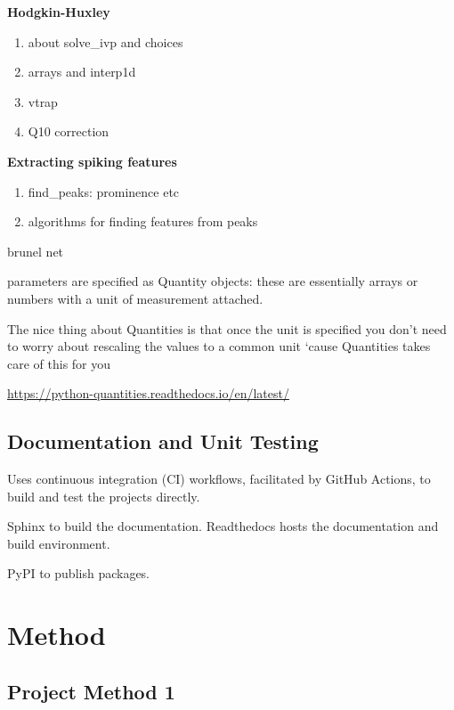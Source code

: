 \textbf{Hodgkin-Huxley}

\begin{enumerate}
    \item about solve\_ivp and choices 
    \item arrays and interp1d
    \item vtrap 
    \item Q10 correction
\end{enumerate}

\textbf{Extracting spiking features}

\begin{enumerate}
    \item find\_peaks: prominence etc 
    \item algorithms for finding features from peaks 
\end{enumerate} 

brunel net

parameters are specified as Quantity objects: these are essentially arrays or numbers with a unit of measurement attached.

The nice thing about Quantities is that once the unit is specified you don’t need to worry about rescaling the values to a common unit ‘cause Quantities takes care of this for you

\url{https://python-quantities.readthedocs.io/en/latest/}

\subsection{Documentation and Unit Testing}

Uses continuous integration (CI) workflows, facilitated by GitHub Actions, to build and test the projects directly.

Sphinx to build the documentation. Readthedocs hosts the documentation and build environment. 

PyPI to publish packages. 

\section{Method}\label{sec:Method}

\subsection{Project Method 1}\label{sec:project method}

